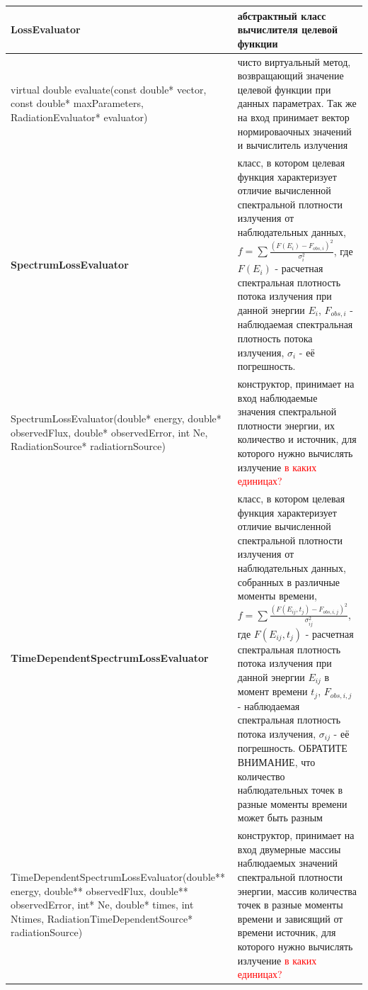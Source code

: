 \begin{small}
	\label{LossEvaluators}
	\begin{xtabular}{|p{0.5\textwidth}|p{0.5\textwidth}|}
		\hline
		\textbf{LossEvaluator} & абстрактный класс вычислителя целевой функции\\
		\hline
		virtual double evaluate(const double* vector, const double* maxParameters, RadiationEvaluator* evaluator) & чисто виртуальный метод, возвращающий значение целевой функции при данных параметрах. Так же на вход принимает вектор нормироваочных значений и вычислитель излучения\\
		\hline
		\textbf{SpectrumLossEvaluator} & класс, в котором целевая функция характеризует отличие вычисленной спектральной плотности излучения от наблюдательных данных, $f = \sum \frac{(F(E_i) - F_{obs,i})^2}{\sigma_i^2}$, где $F(E_i)$ - расчетная спектральная плотность потока излучения при данной энергии $E_i$, $F_{obs,i}$ - наблюдаемая спектральная плотность потока излучения, $\sigma_i$ - её погрешность.\\
		\hline
		SpectrumLossEvaluator(double* energy, double* observedFlux, double* observedError, int Ne, RadiationSource* radiatiornSource) & конструктор, принимает на вход наблюдаемые значения спектральной плотности энергии, их количество и источник, для которого нужно вычислять излучение \textcolor{red}{в каких единицах?}\\
		\hline
		\textbf{TimeDependentSpectrumLossEvaluator} & класс, в котором целевая функция характеризует отличие вычисленной спектральной плотности излучения от наблюдательных данных, собранных в различные моменты времени, $f = \sum \frac{(F(E_{ij}, t_j) - F_{obs,i,j})^2}{\sigma_{ij}^2}$, где $F(E_{ij},t_j)$ - расчетная спектральная плотность потока излучения при данной энергии $E_{ij}$ в момент времени $t_j$, $F_{obs,i,j}$ - наблюдаемая спектральная плотность потока излучения, $\sigma_{ij}$ - её погрешность. ОБРАТИТЕ ВНИМАНИЕ, что количество наблюдательных точек в разные моменты времени может быть разным\\
		\hline
		TimeDependentSpectrumLossEvaluator(double** energy, double** observedFlux, double** observedError, int* Ne, double* times, int Ntimes, RadiationTimeDependentSource* radiationSource) & конструктор, принимает на вход двумерные массиы наблюдаемых значений спектральной плотности энергии, массив количества точек в разные моменты времени и зависящий от времени источник, для которого нужно вычислять излучение \textcolor{red}{в каких единицах?}\\

\end{xtabular}
\end{small}
